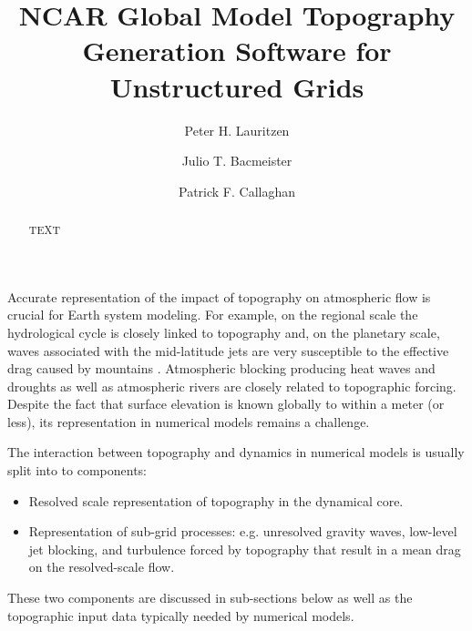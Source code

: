 \documentclass[gmd]{copernicus}
\begin{document}
\linenumbers

\title{NCAR Global Model Topography Generation Software for Unstructured Grids}

\author[1]{Peter H. Lauritzen}
\author[1]{Julio T. Bacmeister}
\author[1]{Patrick F. Callaghan}













\maketitle  %



\begin{abstract}
TEXT
\end{abstract}



\introduction  %
Accurate representation of the impact of topography on atmospheric flow is crucial for Earth system modeling.  For example, on the regional scale the hydrological cycle is closely linked to topography and, on the planetary scale, waves associated with the mid-latitude jets are very susceptible to the effective drag caused by mountains \citep[e.g., ][]{LM1997QJRMS}. Atmospheric blocking producing heat waves and droughts as well as atmospheric rivers are closely related to topographic forcing. Despite the fact that surface elevation is known globally to within a meter (or less), its representation in numerical models remains a challenge.

The interaction between topography and dynamics in numerical models is usually split into to components:
\begin{itemize}
\item Resolved scale representation of topography in the dynamical core.
\item Representation of sub-grid processes: e.g. unresolved gravity waves, low-level jet blocking, and turbulence forced by topography that result in a mean drag on the resolved-scale flow.
\end{itemize}
These two components are discussed in sub-sections below as well as the topographic input data typically needed by numerical models.
\end{document}

